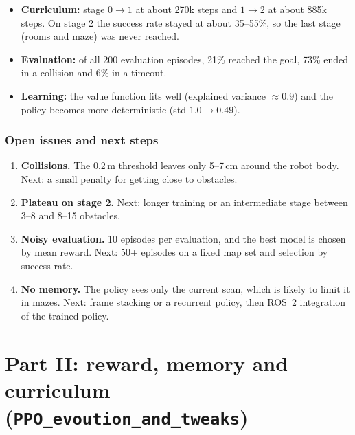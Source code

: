 \documentclass[11pt,a4paper]{article}
\newcommand{\code}[1]{\texttt{#1}}
\begin{document}
\begin{itemize}[leftmargin=*]
      \item \textbf{Curriculum:} stage $0\to1$ at about 270k steps and $1\to2$ at
            about 885k steps. On stage 2 the success rate stayed at about 35--55\%,
            so the last stage (rooms and maze) was never reached.
      \item \textbf{Evaluation:} of all 200 evaluation episodes, 21\% reached the
            goal, 73\% ended in a collision and 6\% in a timeout.
      \item \textbf{Learning:} the value function fits well (explained variance
            $\approx 0.9$) and the policy becomes more deterministic (std
            $1.0 \to 0.49$).
\end{itemize}

\section{Open issues and next steps}
\begin{enumerate}[leftmargin=*]
      \item \textbf{Collisions.} The 0.2\,m threshold leaves only 5--7\,cm around
            the robot body. Next: a small penalty for getting close to obstacles.
      \item \textbf{Plateau on stage 2.} Next: longer training or an intermediate
            stage between 3--8 and 8--15 obstacles.
      \item \textbf{Noisy evaluation.} 10 episodes per evaluation, and the best
            model is chosen by mean reward. Next: 50+ episodes on a fixed map set
            and selection by success rate.
      \item \textbf{No memory.} The policy sees only the current scan, which is
            likely to limit it in mazes. Next: frame stacking or a recurrent
            policy, then ROS~2 integration of the trained policy.
\end{enumerate}

\clearpage
\part*{Part II: reward, memory and curriculum (\code{PPO\_evoution\_and\_tweaks})}
\end{document}
